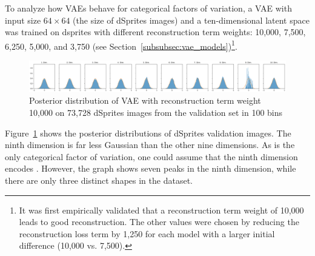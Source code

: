 To analyze how \acp{VAE} behave for categorical factors of variation, a \ac{VAE} with input size $64\times 64$ (the size of dSprites images) and a ten-dimensional latent space was trained on dsprites with different reconstruction term weights: 10,000, 7,500, 6,250, 5,000, and 3,750 (see Section~\ref{subsubsec:vae_models})\footnote{It was first empirically validated that a reconstruction term weight of 10,000 leads to good reconstruction. The other values were chosen by reducing the reconstruction loss term by 1,250 for each model with a larger initial difference (10,000 vs. 7,500).}.

\begin{figure}
    \centering
    \includegraphics[width=\textwidth]{images/latent_space_entanglement/vae_dsprites_lf_10000_dist.png}
    \caption[VAE Latent Space Distribution - dSprites]{Posterior distribution of \ac{VAE} with reconstruction term weight 10,000 on 73,728 dSprites images from the validation set in 100 bins}
    \label{fig:10000_vae_latent_space_distribution}
\end{figure}

Figure~\ref{fig:10000_vae_latent_space_distribution} shows the posterior distributions of dSprites validation images.
The ninth dimension is far less Gaussian than the other nine dimensions.
As  is the only categorical factor of variation, one could assume that the ninth dimension encodes .
However, the graph shows seven peaks in the ninth dimension, while there are only three distinct shapes in the dataset.

